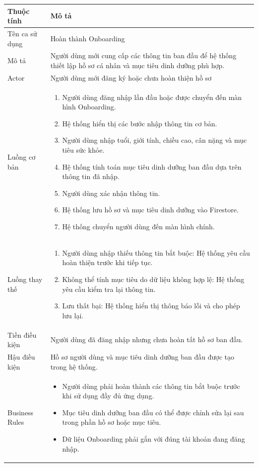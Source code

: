 \begin{longtable}{|p{4cm}|p{11cm}|}
    \hline
    \textbf{Thuộc tính} & \textbf{Mô tả} \\
    \hline
    \endhead
    \hline
    \endfoot
    Tên ca sử dụng & Hoàn thành Onboarding \\
    \hline
    Mô tả & Người dùng mới cung cấp các thông tin ban đầu để hệ thống thiết lập hồ sơ cá nhân và mục tiêu dinh dưỡng phù hợp. \\
    \hline
    Actor & Người dùng mới đăng ký hoặc chưa hoàn thiện hồ sơ \\
    \hline
    Luồng cơ bản &
        \begin{enumerate}[nosep]
            \item Người dùng đăng nhập lần đầu hoặc được chuyển đến màn hình Onboarding.
            \item Hệ thống hiển thị các bước nhập thông tin cơ bản.
            \item Người dùng nhập tuổi, giới tính, chiều cao, cân nặng và mục tiêu sức khỏe.
            \item Hệ thống tính toán mục tiêu dinh dưỡng ban đầu dựa trên thông tin đã nhập.
            \item Người dùng xác nhận thông tin.
            \item Hệ thống lưu hồ sơ và mục tiêu dinh dưỡng vào Firestore.
            \item Hệ thống chuyển người dùng đến màn hình chính.
        \end{enumerate} \\
    \hline
    Luồng thay thế &
        \begin{enumerate}[nosep]
            \item[3a.] Người dùng nhập thiếu thông tin bắt buộc: Hệ thống yêu cầu hoàn thiện trước khi tiếp tục.
            \item[4a.] Không thể tính mục tiêu do dữ liệu không hợp lệ: Hệ thống yêu cầu kiểm tra lại thông tin.
            \item[6a.] Lưu thất bại: Hệ thống hiển thị thông báo lỗi và cho phép lưu lại.
        \end{enumerate} \\
    \hline
    Tiền điều kiện & Người dùng đã đăng nhập nhưng chưa hoàn tất hồ sơ ban đầu. \\
    \hline
    Hậu điều kiện & Hồ sơ người dùng và mục tiêu dinh dưỡng ban đầu được tạo trong hệ thống. \\
    \hline
    Business Rules &
        \begin{itemize}[nosep]
            \item Người dùng phải hoàn thành các thông tin bắt buộc trước khi sử dụng đầy đủ ứng dụng.
            \item Mục tiêu dinh dưỡng ban đầu có thể được chỉnh sửa lại sau trong phần hồ sơ hoặc mục tiêu.
            \item Dữ liệu Onboarding phải gắn với đúng tài khoản đang đăng nhập.
        \end{itemize} \\
    \hline
\end{longtable}


